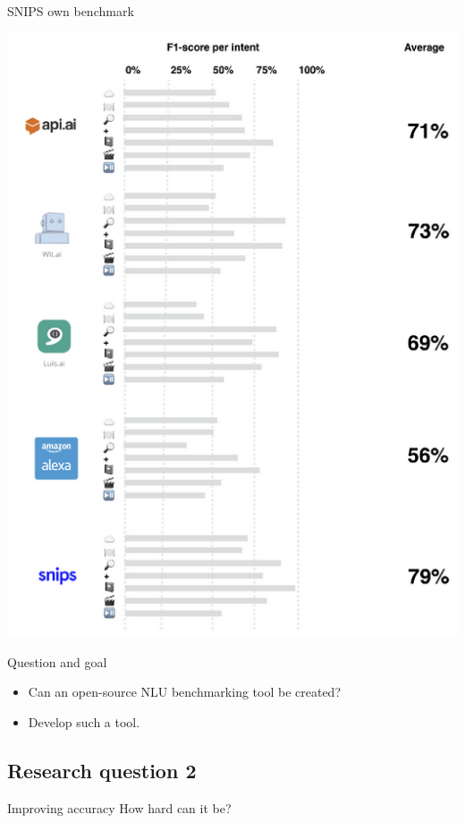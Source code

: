 \documentclass[pdf]{beamer}
\begin{document}
\begin{frame}{SNIPS own benchmark}
  \begin{center}
\includegraphics[height=0.85\textheight]{figures/snips_own_benchmark.png}
  \end{center}
\end{frame}

\begin{frame}{Question and goal}
  \begin{itemize}
  \item Can an open-source NLU benchmarking tool be created?
  \item Develop such a tool.
  \end{itemize}
\end{frame}

\subsection{Research question 2}
\begin{frame}{Improving accuracy}
 How hard can it be? 
\end{frame}
\end{document}
